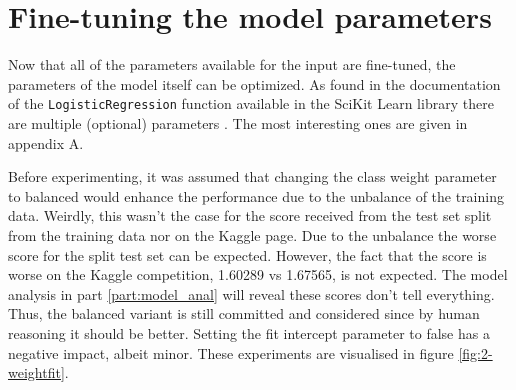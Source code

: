 
\section{Fine-tuning the model parameters}
\label{section:LBM_finetuning_model}

Now that all of the parameters available for the input are fine-tuned, the parameters of the model itself can be optimized.
As found in the documentation of the \texttt{LogisticRegression} function available in the SciKit Learn library there are multiple (optional) parameters \citep{scikit_learn}.
The most interesting ones are given in appendix A. 


Before experimenting, it was assumed that changing the class weight parameter to balanced would enhance the performance due to the unbalance of the training data.
Weirdly, this wasn't the case for the score received from the test set split from the training data nor on the Kaggle page.
Due to the unbalance the worse score for the split test set can be expected.
However, the fact that the score is worse on the Kaggle competition, 1.60289 vs 1.67565, is not expected.
The model analysis in part \ref{part:model_anal} will reveal these scores don't tell everything.
Thus, the balanced variant is still committed and considered since by human reasoning it should be better.
Setting the fit intercept parameter to false has a negative impact, albeit minor.
These experiments are visualised in figure \ref{fig:2-weightfit}.

